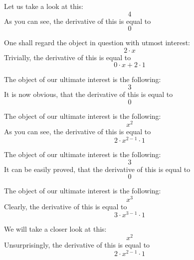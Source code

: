 \documentclass{article}
\begin{document}
Let us take a look at this:
\begin{equation}
4 
\end{equation}
As you can see, the derivative of this is equal to
\begin{equation}
0 
\end{equation}

One shall regard the object in question with utmost interest:
\begin{equation}
2 \cdot x 
\end{equation}
Trivially, the derivative of this is equal to
\begin{equation}
0 \cdot x + 2 \cdot 1 
\end{equation}

The object of our ultimate interest is the following:
\begin{equation}
3 
\end{equation}
It is now obvious, that the derivative of this is equal to
\begin{equation}
0 
\end{equation}

The object of our ultimate interest is the following:
\begin{equation}
x ^{2 } 
\end{equation}
As you can see, the derivative of this is equal to
\begin{equation}
2 \cdot x ^{2 - 1 } \cdot 1 
\end{equation}

The object of our ultimate interest is the following:
\begin{equation}
3 
\end{equation}
It can be easily proved, that the derivative of this is equal to
\begin{equation}
0 
\end{equation}

The object of our ultimate interest is the following:
\begin{equation}
x ^{3 } 
\end{equation}
Clearly, the derivative of this is equal to
\begin{equation}
3 \cdot x ^{3 - 1 } \cdot 1 
\end{equation}

We will take a closer look at this:
\begin{equation}
x ^{2 } 
\end{equation}
Unsurprisingly, the derivative of this is equal to
\begin{equation}
2 \cdot x ^{2 - 1 } \cdot 1 
\end{equation}
\end{document}
